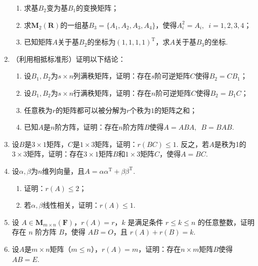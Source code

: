 \begin{enumerate}
\begin{enumerate}
              \item 求基$B_2$变为基$B_1$的变换矩阵；

              \item 求$\mathbf{M}_2(\mathbf{R})$的一组基$B_3=\{A_1,A_2,A_3,A_4\}$，使得$A_i^2=A_i,\enspace i=1,2,3,4$；

              \item 已知矩阵$A$关于基$B_2$的坐标为$(1,1,1,1)^\mathrm{T}$，求$A$关于基$B_3$的坐标.
          \end{enumerate}

    \item （利用相抵标准形）证明以下结论：
          \begin{enumerate}
              \item 设$B_1,B_2$为$s \times n$列满秩矩阵，证明：存在$s$阶可逆矩阵$C$使得$B_2=CB_1$；

              \item 设$B_1,B_2$为$s \times n$行满秩矩阵，证明：存在$n$阶可逆矩阵$C$使得$B_2=B_1C$；

              \item 任意秩为$r$的矩阵都可以被分解为$r$个秩为$1$的矩阵之和；

              \item 已知$A$是$n$阶方阵，证明：存在$n$阶方阵$B$使得$A=ABA,\enspace B=BAB$.
          \end{enumerate}

    \item 设$B$是$3 \times 1$矩阵，$C$是$1 \times 3$矩阵，证明：$r(BC) \leqslant 1$. 反之，若$A$是秩为1的$3 \times 3$矩阵，证明：存在$3 \times 1$矩阵$B$和$1 \times 3$矩阵$C$，使得$A = BC$.

    \item 设$\alpha,\beta$为$n$维列向量，且$A=\alpha\alpha^\mathrm{T}+\beta\beta^\mathrm{T}$.
          \begin{enumerate}
              \item 证明：$r(A) \leqslant 2$；

              \item 若$\alpha,\beta$线性相关，证明：$r(A) \leqslant 1$.
          \end{enumerate}

    \item 设 $A \in \mathbf{M}_{m \times n}(\mathbf{F})$，$r(A)=r$，$k$ 是满足条件 $r \leqslant k \leqslant n$ 的任意整数，证明存在 $n$ 阶方阵 $B$，使得 $AB=O$，且 $r(A)+r(B)=k$.

    \item 设$A$是$m \times n$矩阵（$m \leqslant n$），$r(A)=m$，证明：存在$n \times m$矩阵$B$使得$AB=E$.


\end{enumerate}
